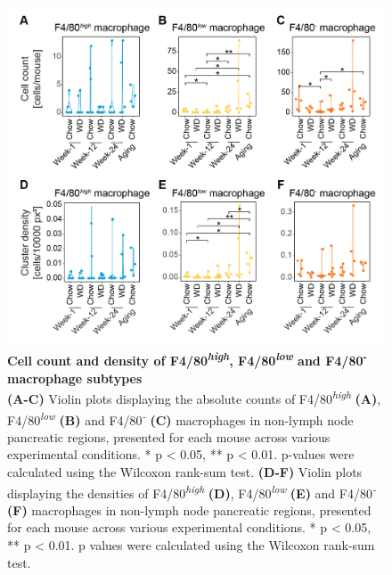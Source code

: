 \begin{figure}[htbp]
    \centering
    \includegraphics[width=12cm]{Appendix2/Fig/F2-A3-01.png}
    \caption[imc-peri]{\textbf{Cell count and density of F4/80\textsuperscript{\textit{high}}, F4/80\textsuperscript{\textit{low}} and F4/80\textsuperscript{-} macrophage subtypes}\\
    \textbf{(A-C)} Violin plots displaying the absolute counts of F4/80\textsuperscript{\textit{high}} \textbf{(A)}, F4/80\textsuperscript{\textit{low}} \textbf{(B)} and F4/80\textsuperscript{\textit{-}} \textbf{(C)} macrophages in non-lymph node pancreatic regions, presented for each mouse across various experimental conditions.  * p < 0.05, ** p < 0.01. p-values were calculated using the Wilcoxon rank-sum test. \textbf{(D-F)} Violin plots displaying the densities of F4/80\textsuperscript{\textit{high}} \textbf{(D)}, F4/80\textsuperscript{\textit{low}} \textbf{(E)} and F4/80\textsuperscript{\textit{-}} \textbf{(F)} macrophages in non-lymph node pancreatic regions, presented for each mouse across various experimental conditions. * p < 0.05, ** p < 0.01. p values were calculated using the Wilcoxon rank-sum test. }
    \label{suppl_fig:imc_peri}
\end{figure}


